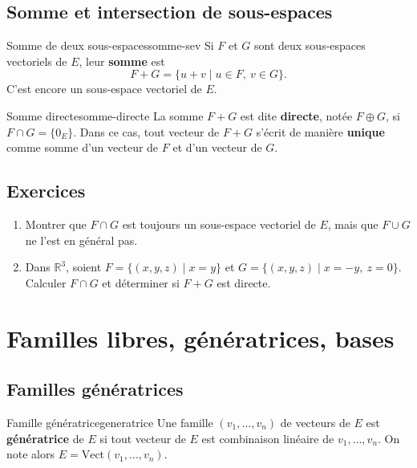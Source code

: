 \documentclass[theme=pringlea]{myrtille}
\begin{document}
\subsection{Somme et intersection de sous-espaces}
\begin{myrdef}{Somme de deux sous-espaces}{somme-sev}
Si $F$ et $G$ sont deux sous-espaces vectoriels de $E$, leur \textbf{somme} est
\[ F + G = \{ u + v \mid u \in F,\ v \in G \}. \]
C'est encore un sous-espace vectoriel de $E$.
\end{myrdef}

\begin{myrdef}{Somme directe}{somme-directe}
La somme $F + G$ est dite \textbf{directe}, notée $F \oplus G$, si $F \cap G = \{0_E\}$. Dans ce cas, tout vecteur de $F + G$ s'écrit de manière \textbf{unique} comme somme d'un vecteur de $F$ et d'un vecteur de $G$.
\end{myrdef}

\subsection{Exercices}
\begin{enumerate}
    \item Montrer que $F \cap G$ est toujours un sous-espace vectoriel de $E$, mais que $F \cup G$ ne l'est en général pas.
    \item Dans $\mathbb{R}^3$, soient $F = \{(x,y,z) \mid x = y\}$ et $G = \{(x,y,z) \mid x = -y,\ z=0\}$. Calculer $F \cap G$ et déterminer si $F + G$ est directe.
\end{enumerate}


\section{Familles libres, génératrices, bases}

\subsection{Familles génératrices}
\begin{myrdef}{Famille génératrice}{generatrice}
Une famille $(v_1, \dots, v_n)$ de vecteurs de $E$ est \textbf{génératrice} de $E$ si tout vecteur de $E$ est combinaison linéaire de $v_1, \dots, v_n$. On note alors $E = \mathrm{Vect}(v_1, \dots, v_n)$.
\end{myrdef}
\end{document}
